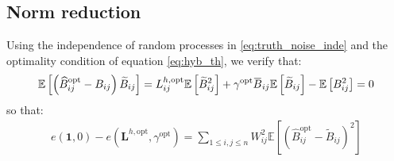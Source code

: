 \documentclass[12pt]{scrartcl}
\newcommand{\overbar}[1]{\mkern 1.5mu\overline{\mkern-1.5mu#1\mkern-1.5mu}\mkern 1.5mu}
\begin{document}
\subsection{Norm reduction}
Using the independence of random processes in \eqref{eq:truth_noise_inde} and the optimality condition of equation \eqref{eq:hyb_th}, we verify that:
\begin{align}
\mathbb{E}\left[\left(\widehat{B}_{ij}^\mathrm{opt} - B_{ij}\right) \widetilde{B}_{ij} \right] = L_{ij}^{h,\mathrm{opt}} \mathbb{E}\left[\widetilde{B}_{ij}^2\right] + \gamma^\mathrm{opt} \overbar{B}_{ij} \mathbb{E}\left[\widetilde{B}_{ij}\right] - \mathbb{E}\left[B^2_{ij} \right] = 0 
\end{align}
so that:
\begin{align}
e\left(\boldsymbol{1},0\right) - e\left(\mathbf{L}^{h,\mathrm{opt}},\gamma^\mathrm{opt}\right) = \sum_{1 \le i,j \le n} W_{ij}^2 \mathbb{E}\left[ \left(\widehat{B}_{ij}^\mathrm{opt} - \widetilde{B}_{ij}\right)^2\right]
\end{align}
\end{document}
